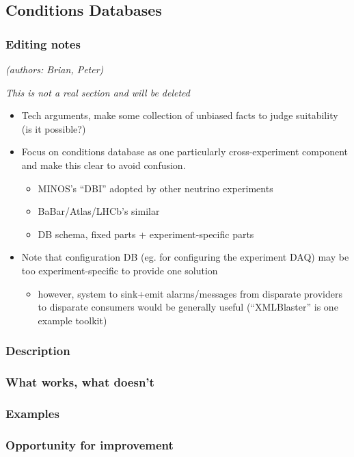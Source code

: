 \subsection{Conditions Databases}

\subsubsection{Editing notes}

\textit{(authors: Brian, Peter)}

\textit{This is not a real section and will be deleted}


\begin{itemize}
\item Tech arguments, make some collection of unbiased facts to judge suitability (is it possible?)
\item Focus on conditions database as one particularly cross-experiment component and make this clear to avoid confusion.
  \begin{itemize}
  \item MINOS's ``DBI'' adopted by other neutrino experiments
  \item BaBar/Atlas/LHCb's similar
  \item DB schema, fixed parts + experiment-specific parts
  \end{itemize}
\item Note that configuration DB (eg. for configuring the experiment DAQ) may be too experiment-specific to provide one solution
  \begin{itemize}
  \item however, system to sink+emit alarms/messages from disparate providers to disparate consumers would be generally useful (``XMLBlaster'' is one example toolkit)
  \end{itemize}
\end{itemize}

\subsubsection{Description}
\subsubsection{What works, what doesn't}
\subsubsection{Examples}
\subsubsection{Opportunity for improvement}
